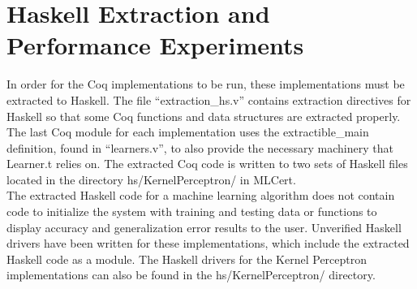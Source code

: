 \section{Haskell Extraction and Performance Experiments}\label{HaskellExtractionPerformance}
In order for the Coq implementations to be run, these implementations must be extracted to Haskell. The file ``extraction\_hs.v'' contains extraction directives for Haskell so that some Coq functions and data structures are extracted properly. The last Coq module for each implementation uses the extractible\_main definition, found in ``learners.v'', to also provide the necessary machinery that Learner.t relies on. The extracted Coq code is written to two sets of Haskell files located in the directory hs/KernelPerceptron/ in MLCert.
\\The extracted Haskell code for a machine learning algorithm does not contain code to initialize the system with training and testing data or functions to display accuracy and generalization error results to the user. Unverified Haskell drivers have been written for these implementations, which include the extracted Haskell code as a module. The Haskell drivers for the Kernel Perceptron implementations can also be found in the hs/KernelPerceptron/ directory.
